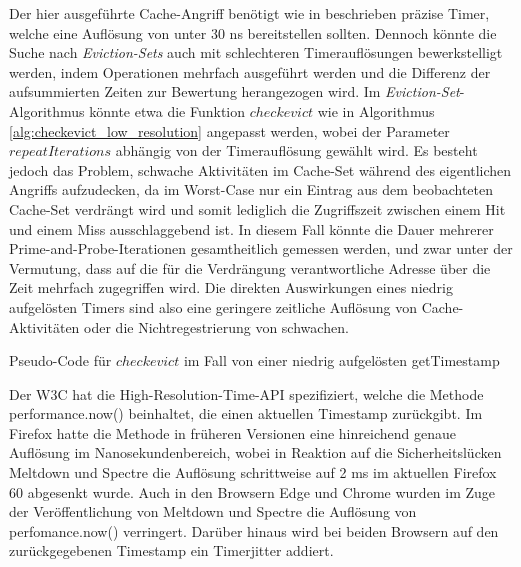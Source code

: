 Der hier ausgeführte Cache-Angriff benötigt wie in beschrieben präzise Timer, welche eine Auflösung von unter 30 ns bereitstellen sollten. Dennoch könnte die Suche nach \textit{Eviction-Sets} auch mit schlechteren Timerauflösungen bewerkstelligt werden, indem Operationen mehrfach ausgeführt werden und die Differenz der aufsummierten Zeiten zur Bewertung herangezogen wird.
Im \textit{Eviction-Set}-Algorithmus könnte etwa die Funktion $checkevict$ wie in Algorithmus \ref{alg:checkevict_low_resolution} angepasst werden, wobei der Parameter $repeatIterations$ abhängig von der Timerauflösung gewählt wird. 
Es besteht jedoch das Problem, schwache Aktivitäten im Cache-Set während des eigentlichen Angriffs aufzudecken, da im Worst-Case nur ein Eintrag aus dem beobachteten Cache-Set verdrängt wird und somit lediglich die Zugriffszeit zwischen einem Hit und einem Miss ausschlaggebend ist. 
In diesem Fall könnte die Dauer mehrerer Prime-and-Probe-Iterationen gesamtheitlich gemessen werden, und zwar unter der Vermutung, dass auf die für die Verdrängung verantwortliche Adresse über die Zeit mehrfach zugegriffen wird. %
Die direkten Auswirkungen eines niedrig aufgelösten Timers sind also eine geringere zeitliche Auflösung von Cache-Aktivitäten oder die Nichtregestrierung von schwachen.

\begin{algorithm}[h]
\DontPrintSemicolon
\caption{Pseudo-Code für $checkevict$ im Fall von einer niedrig aufgelösten getTimestamp}
\label{alg:checkevict_low_resolution}


\end{algorithm}

Der W3C hat die High-Resolution-Time-API spezifiziert, welche die Methode performance.now() beinhaltet, die einen aktuellen Timestamp zurückgibt. Im Firefox hatte die Methode in früheren Versionen eine hinreichend genaue Auflösung im Nanosekundenbereich, wobei in Reaktion auf die Sicherheitslücken Meltdown und Spectre die Auflösung schrittweise auf 2 ms im aktuellen Firefox 60 abgesenkt wurde. 
Auch in den Browsern Edge und Chrome wurden im Zuge der Veröffentlichung von Meltdown und Spectre die Auflösung von perfomance.now() verringert.
Darüber hinaus wird bei beiden Browsern auf den zurückgegebenen Timestamp ein Timerjitter addiert.

